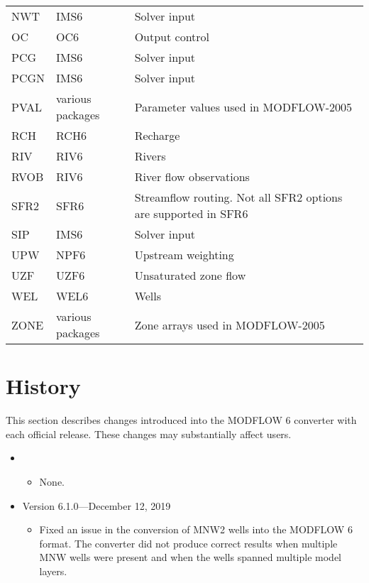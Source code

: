 \documentclass[11pt,twoside,twocolumn]{usgsreport}
\begin{document}
\begin{table}[ht]
\begin{tabular*}{\columnwidth}{l l l}
NWT & IMS6 & Solver input \\
OC & OC6 & Output control \\
PCG & IMS6 & Solver input  \\
PCGN & IMS6 & Solver input  \\
PVAL & various packages & Parameter values used in MODFLOW-2005 \\
RCH & RCH6 & Recharge \\
RIV & RIV6 & Rivers \\
RVOB & RIV6 & River flow observations  \\
SFR2 & SFR6 & Streamflow routing. Not all SFR2 options are supported in SFR6  \\
SIP & IMS6 & Solver input  \\
UPW & NPF6 & Upstream weighting \\
UZF & UZF6 & Unsaturated zone flow \\
WEL & WEL6 & Wells \\
ZONE & various packages & Zone arrays used in MODFLOW-2005 \\
\hline 
\end{tabular*}
\label{tab:supportedpackages}
\normalsize
\end{table}


\section{History}
This section describes changes introduced into the MODFLOW 6 converter with each official release.  These changes may substantially affect users.

\begin{itemize}

\item
\currentmodflowversion
\begin{itemize}
  \item None.
\end{itemize}

\item Version 6.1.0---December 12, 2019
\begin{itemize}
  \item Fixed an issue in the conversion of MNW2 wells into the MODFLOW 6 format.  The converter did not produce correct results when multiple MNW wells were present and when the wells spanned multiple model layers.
\end{itemize}

\end{itemize}

\REFSECTION



\justifying
\vspace*{\fill}
\clearpage
\pagestyle{backofreport}
\makebackcover
\end{document}
